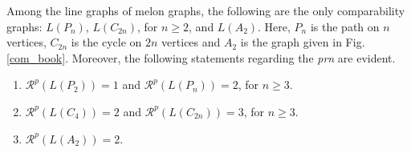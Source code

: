 \documentclass{llncs}
\begin{document}
\begin{theorem}
	Among the line graphs of melon graphs, the following are the only comparability graphs: $L(P_n)$, $L(C_{2n})$, for $n \ge 2$, and $L(A_2)$. Here, $P_n$ is the path on $n$ vertices, $C_{2n}$ is the cycle on $2n$ vertices and $A_2$ is the graph given in Fig. \ref{com_book}.	 Moreover, the following statements regarding the \textit{prn} are evident.   
	\begin{enumerate}
		\item $\mathcal{R}^p(L(P_2)) = 1$ and $\mathcal{R}^p(L(P_n)) = 2$, for $n \ge 3$. 
		\item $\mathcal{R}^p(L(C_4)) = 2$ and $\mathcal{R}^p(L(C_{2n})) = 3$, for $n \ge 3$. 
		\item  $\mathcal{R}^p(L(A_2)) = 2$. 
	\end{enumerate}
\end{theorem}
\end{document}
